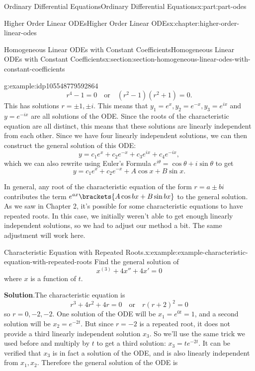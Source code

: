 \documentclass[oneside,10pt,]{book}
\newcommand{\blocktitlefont}{\relax}
\numberwithin{equation}{part}
\begin{document}
\begin{partptx}{Ordinary Differential Equations}{}{Ordinary Differential Equations}{}{}{x:part:part-odes}
\begin{chapterptx}{Higher Order Linear ODEs}{}{Higher Order Linear ODEs}{}{}{x:chapter:higher-order-linear-odes}
\begin{sectionptx}{Homogeneous Linear ODEs with Constant Coefficients}{}{Homogeneous Linear ODEs with Constant Coefficients}{}{}{x:section:section-homogeneous-linear-odes-with-constant-coefficients}
\begin{example}{}{g:example:idp105548779592864}
\begin{equation*}
r^{4}-1=0\quad\text{or}\quad (r^{2}-1)(r^{2}+1)=0.
\end{equation*}
This has solutions \(r=\pm1,\pm i\). This means that \(y_{1} = e^{x},y_{2}=e^{-x},y_{3}=e^{ix}\) and \(y=e^{-ix}\) are all solutions of the ODE. Since the roots of the characteristic equation are all distinct, this means that these solutions are linearly independent from each other. Since we have four linearly independent solutions, we can then construct the general solution of this ODE:%
\begin{equation*}
y = c_{1}e^{x}+c_{2}e^{-x}+c_{3}e^{ix}+c_{4}e^{-ix},
\end{equation*}
which we can also rewrite using Euler's Formula \(e^{i\theta} = \cos\theta+i\sin\theta\) to get%
\begin{equation*}
y = c_{1}e^{x}+c_{2}e^{-x}+A\cos x+B\sin x.
\end{equation*}
%
\end{example}
In general, any root of the characteristic equation of the form \(r=a\pm bi\) contributes the term \(e^{ax}\brackets{A\cos bx+B\sin bx}\) to the general solution. As we saw in Chapter 2, it's possible for some characteristic equations to have repeated roots. In this case, we initially weren't able to get enough linearly independent solutions, so we had to adjust our method a bit. The same adjustment will work here.%
\begin{example}{Characteristic Equation with Repeated Roots.}{x:example:example-characteristic-equation-with-repeated-roots}%
Find the general solution of%
\begin{equation*}
x^{(3)}+4x''+4x'=0
\end{equation*}
where \(x\) is a function of \(t\).%
\par\smallskip%
\noindent\textbf{\blocktitlefont Solution}.\hypertarget{g:solution:idp105548779535136}{}\quad{}The characteristic equation is%
\begin{equation*}
r^{3}+4r^{2}+4r = 0\quad\text{or}\quad r(r+2)^{2}=0
\end{equation*}
so \(r=0,-2,-2\). One solution of the ODE will be \(x_{1} = e^{0t} = 1\), and a second solution will be \(x_{2} = e^{-2t}\). But since \(r=-2\) is a repeated root, it does not provide a third linearly independent solution \(x_{3}\). So we'll use the same trick we used before and multiply by \(t\) to get a third solution: \(x_{3} = te^{-2t}\). It can be verified that \(x_{3}\) is in fact a solution of the ODE, and is also linearly independent from \(x_{1},x_{2}\). Therefore the general solution of the ODE is%

\end{example}
\end{sectionptx}
\end{chapterptx}
\end{partptx}
\end{document}
